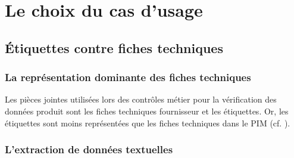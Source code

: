             \begin{spacing}{1.0}
            \begin{centering}
                {\renewcommand{\arraystretch}{1.5}%
                {\scriptsize
                
                }
                }                
            \end{centering}
            \end{spacing}

    


    \chapter{Le choix du cas d'usage}

        \section{\'{E}tiquettes contre fiches techniques}

            \subsection{La représentation dominante des fiches techniques}
            
            Les pièces jointes utilisées lors des contrôles métier pour la vérification des données produit sont les fiches techniques fournisseur et les étiquettes.
            Or, les étiquettes sont moins représentées que les fiches techniques dans le PIM (cf. ).
            
            \subsection{L'extraction de données textuelles}

